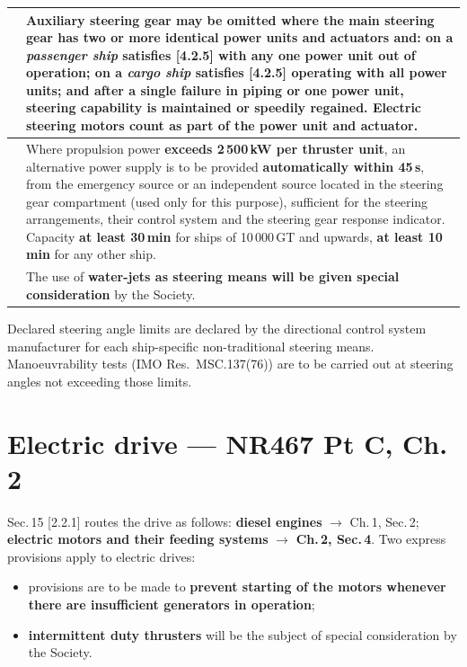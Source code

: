 \documentclass[11pt,a4paper]{report}
\begin{document}
\begin{longtable}{|p{2.6cm}|p{12.3cm}|}
\hline
[4.2.7] & Auxiliary steering gear may be \textbf{omitted} where the main steering gear has two or more identical power units and actuators and: on a \emph{passenger ship} satisfies [4.2.5] with any one power unit out of operation; on a \emph{cargo ship} satisfies [4.2.5] operating with all power units; and after a single failure in piping or one power unit, steering capability is maintained or speedily regained. Electric steering motors count as part of the power unit and actuator. \\
\hline
[4.2.8] & Where propulsion power \textbf{exceeds 2\,500\,kW per thruster unit}, an alternative power supply is to be provided \textbf{automatically within 45\,s}, from the emergency source or an independent source located in the steering gear compartment (used only for this purpose), sufficient for the steering arrangements, their control system and the steering gear response indicator. Capacity \textbf{at least 30\,min} for ships of 10\,000\,GT and upwards, \textbf{at least 10\,min} for any other ship. \\
\hline
[4.3.1] & The use of \textbf{water-jets as steering means will be given special consideration} by the Society. \\
\hline
\end{longtable}

\noindent Declared steering angle limits are declared by the directional control
system manufacturer for each ship-specific non-traditional steering means.
Manoeuvrability tests (IMO Res.\ MSC.137(76)) are to be carried out at steering
angles not exceeding those limits.

\newpage

\section{Electric drive --- NR467 Pt C, Ch.\,2}
\label{sec:electricrule}

Sec.\,15 [2.2.1] routes the drive as follows: \textbf{diesel engines}
$\rightarrow$ Ch.\,1, Sec.\,2; \textbf{electric motors and their feeding
systems} $\rightarrow$ \textbf{Ch.\,2, Sec.\,4}. Two express provisions apply to
electric drives:

\begin{itemize}[leftmargin=*]
\item provisions are to be made to \textbf{prevent starting of the motors
whenever there are insufficient generators in operation};
\item \textbf{intermittent duty thrusters} will be the subject of special
consideration by the Society.
\end{itemize}
\end{document}
